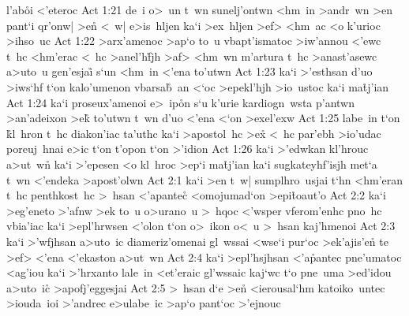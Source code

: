 l'ab\r{o}i
<'eteroc\bibvsend
\vs Act 1:21
de~i
o>~un
t~wn
sunelj'ontwn
<hm~in
>andr~wn
>en
pant`i
qr'onw|
>e\r{n}
<~w|
e>is~hljen
ka`i
>ex~hljen
>ef>
<hm~ac
<o
k'urioc
>ihso~uc\bibvsend
\vs Act 1:22
>arx'amenoc
>ap`o
to~u
vbapt'ismatoc
>iw'annou
<'ewc
t~hc
<hm'erac
<~hc
>anel'h\r{f}jh
>af>
<hm~wn
m'artura
t~hc
>anast'asewc
a>uto~u
gen'esjai\r{}
s`un
<hm~in
<'ena
to'utwn\bibvsend
\vs Act 1:23
ka`i
>'esthsan
d'uo
>iws`hf
t`on
kalo'umenon
vbarsa\r{b}~an
<`oc
>epekl'hjh
>io~ustoc
ka`i
ma\r{t}j'ian\bibvsend
{}
\vs Act 1:24
ka`i
proseux'amenoi
e>~ip\r{o}n
s`u
k'urie
kardiogn~wsta
p'antwn
>an'adeixon
>ek\r{}
to'utwn
t~wn
d'uo
<'ena
<`on
>exel'exw\bibvsend
\vs Act 1:25
labe~in
t`on
\r{k}l~hron
t~hc
diakon'iac
ta'uthc
ka`i
>apostol~hc
>ex\r{}
<~hc
par'ebh
>io'udac
poreuj~hnai
e>ic
t`on
t'opon
t`on
>'idion\bibvsend
\vs Act 1:26
ka`i
>'edwkan
kl'hrouc
a>ut~w\r{n}
ka`i
>'epesen
<o
kl~hroc
>ep`i
ma\r{t}j'ian
ka`i
sugkateyhf'isjh
met`a
t~wn
<'endeka
>apost'olwn\bibvsend
\vs Act 2:1
ka`i
>en
t~w|
sumplhro~usjai
t`hn
<hm'eran
t~hc
penthkost~hc
>~hsan
<'apantec\r{}
<omojumad`on
>epi\r{t}oaut'o\bibvsend
{}
\vs Act 2:2
ka`i
>eg'eneto
>'afnw
>ek
to~u
o>urano~u
>~hqoc
<'wsper
vferom'enhc
pno~hc
vbia'iac
ka`i
>epl'hrwsen
<'olon
t`on
o>~ikon
o<~u
>~hsan
kaj'hmenoi\bibvsend
\vs Act 2:3
ka`i
>'wfjhsan
a>uto~ic
diameriz'omenai
gl~wssai
<wse`i
pur`oc
>ek'ajis'en\r{}
te
>ef>
<'ena
<'ekaston
a>ut~wn\bibvsend
\vs Act 2:4
ka`i
>epl'hsjhsan
<'a\r{p}antec
pne'umatoc
<ag'iou
ka`i
>'hrxanto
lale~in
<et'eraic
gl'wssaic
kaj`wc
t`o
pne~uma
>ed'idou
a>uto~ic\r{}
>apofj'eggesjai\bibvsend
\vs Act 2:5
>~hsan
d`e
>e\r{n}
<ierousal`hm
katoiko~untec
>iouda~ioi
>'andrec
e>ulabe~ic
>ap`o
pant`oc
>'ejnouc
